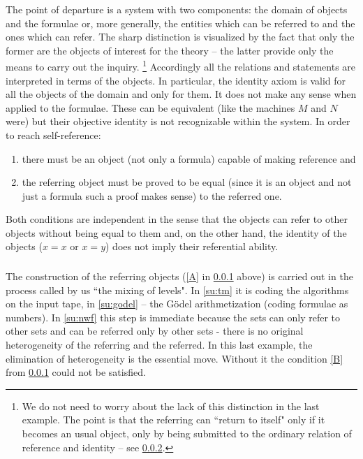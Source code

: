 \subsubsection{}\label{g:i}
The point of departure is a system with two components: the domain of objects and the formulae or, more 
generally, the entities which can be referred to and the ones which can refer. The sharp distinction is visualized by 
the fact that only the former are the objects of interest for the theory -- the latter provide only the means to carry 
out the inquiry. \footnote{We do not need to worry about the lack of this distinction in the last example. The point is that 
the referring can ``return to itself" only if it becomes an usual object, only by being submitted to the ordinary 
relation of reference and identity -- see \ref{g:ii}.} Accordingly all the relations and statements are interpreted in 
terms of the objects. In particular, the identity axiom is valid for all the objects of the domain and only for them. 
It does not make any sense when applied to the formulae. These can be equivalent (like the machines $M$ and $N$ were) 
but their objective identity is not recognizable within the system. In order to reach self-reference:
\begin{enumerate}
\item \label{A} there must be an object (not only a formula) capable of making reference and
\item \label{B} the referring object must be proved to be equal (since it is an object and not just a formula such a proof makes sense) to the referred one.
\end{enumerate}
Both conditions are independent in the sense that the objects can refer to other objects without being equal to 
them and, on the other hand, the identity of the objects ($x=x$ or $x=y$) does not imply their referential ability.

\subsubsection{}\label{g:ii}
 The construction of the referring objects (\ref{A} in \ref{g:i} above) is carried out in the process called by us ``the mixing of 
levels". In \ref{su:tm} it is coding the algorithms on the input tape, in \ref{su:godel} -- 
the G\"{o}del arithmetization (coding formulae as 
numbers). In \ref{su:nwf} this step is immediate because the sets can only refer to other sets and can be referred only by other 
sets - there is no original heterogeneity of the referring and the referred. 
In this last example, the elimination of  heterogeneity is the 
essential move. Without it the condition \ref{B} from \ref{g:i} could not be satisfied.

